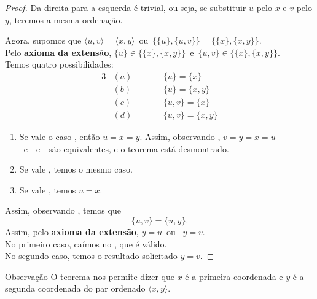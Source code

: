 \begin{proof}
  Da direita para a esquerda é trivial, ou seja, se substituir $u$ pelo $x$ e $v$ pelo $y$, teremos a mesma ordenação.

  Agora, supomos que $\langle u ,v\rangle = \langle x ,y\rangle$\ ou\ $\{\{u\},\{u, v\}\} = \{\{x\},\{x, y\}\}.$\\
  Pelo \textbf{axioma da extensão}, $\{u\} \in \{\{x\},\{x, y\}\}$\ e\ $\{u, v\} \in \{\{x\},\{x, y\}\}.$\\
  Temos quatro possibilidades:
  \begin{alignat*}{3}
    &(a)& \quad \quad & \{u\} = \{x\}\\
    &(b)& \quad \quad & \{u\} = \{x, y\}\\
    &(c)& \quad \quad & \{u, v\} = \{x\}\\
    &(d)& \quad \quad & \{u, v\} = \{x, y\}
  \end{alignat*}
\begin{enumerate}[i]
  \item Se vale o caso \color{black}, então $u = x = y$. Assim, observando \color{black}, $v = y = x = u$\ e\ \color{black}\ e\ \color{black}\ são equivalentes, e o teorema está desmontrado.
  \item Se vale \color{black}, temos o mesmo caso.
  \item Se vale \color{black}, temos $u = x$.  
\end{enumerate}
Assim, observando \color{black}, temos que
$$\{u, v\} = \{u, y\}.$$
Assim, pelo \textbf{axioma da extensão}, $y = u$\ ou \ $y = v$.\\
No primeiro caso, caímos no \color{black}, que é válido.\\
No segundo caso, temos o resultado solicitado $y = v.$
\end{proof}  
\begin{mymdframed}{Observação}
  O teorema nos permite dizer que $x$ é a primeira coordenada e $y$ é a segunda coordenada do par ordenado $\langle x ,y\rangle$.
\end{mymdframed}

